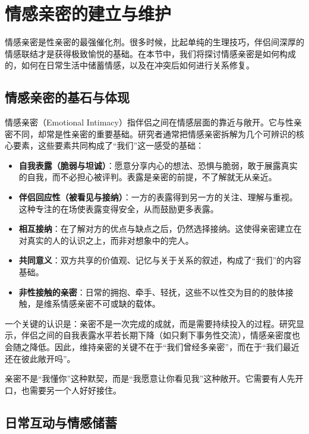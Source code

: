 \documentclass[12pt,UTF8]{ctexbook}
\begin{document}
\section{情感亲密的建立与维护}

情感亲密是性亲密的最强催化剂。很多时候，比起单纯的生理技巧，伴侣间深厚的情感联结才是获得极致愉悦的基础。在本节中，我们将探讨情感亲密是如何构成的，如何在日常生活中储蓄情感，以及在冲突后如何进行关系修复。

\subsection{情感亲密的基石与体现}

情感亲密（Emotional Intimacy）指伴侣之间在情感层面的靠近与敞开。它与性亲密不同，却常是性亲密的重要基础。研究者通常把情感亲密拆解为几个可辨识的核心要素，这些要素共同构成了“我们”这一感受的基础：

\begin{itemize}
\item \textbf{自我表露（脆弱与坦诚）}：愿意分享内心的想法、恐惧与脆弱，敢于展露真实的自我，而不必担心被评判。表露是亲密的前提，不了解就无从亲近。
\item \textbf{伴侣回应性（被看见与接纳）}：一方的表露得到另一方的关注、理解与重视。这种专注的在场使表露变得安全，从而鼓励更多表露。
\item \textbf{相互接纳}：在了解对方的优点与缺点之后，仍然选择接纳。这使得亲密建立在对真实的人的认识之上，而非对想象中的完人。
\item \textbf{共同意义}：双方共享的价值观、记忆与关于关系的叙述，构成了“我们”的内容基础。
\item \textbf{非性接触的亲密}：日常的拥抱、牵手、轻抚，这些不以性交为目的的肢体接触，是维系情感亲密不可或缺的载体。
\end{itemize}

一个关键的认识是：亲密不是一次完成的成就，而是需要持续投入的过程。研究显示，伴侣之间的自我表露水平若长期下降（如只剩下事务性交流），情感亲密度也会随之降低。因此，维持亲密的关键不在于“我们曾经多亲密”，而在于“我们最近还在彼此敞开吗”。

\begin{tcolorbox}[colback=pink!5!white,colframe=red!50!black,title=贴心小叮咛]
亲密不是“我懂你”这种默契，而是“我愿意让你看见我”这种敞开。它需要有人先开口，也需要另一个人好好接住。
\end{tcolorbox}

\subsection{日常互动与情感储蓄}
\end{document}
